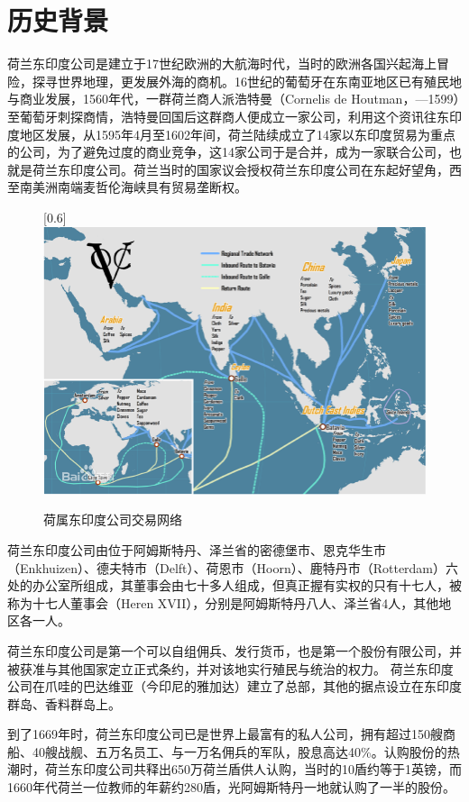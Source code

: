 \documentclass{ctexbook}
\begin{document}
\section{历史背景}
荷兰东印度公司是建立于17世纪欧洲的大航海时代，当时的欧洲各国兴起海上冒险，探寻世界地理，更发展外海的商机。16世纪的葡萄牙在东南亚地区已有殖民地与商业发展，1560年代，一群荷兰商人派浩特曼（Cornelis de Houtman，—1599）至葡萄牙刺探商情，浩特曼回国后这群商人便成立一家公司，利用这个资讯往东印度地区发展，从1595年4月至1602年间，荷兰陆续成立了14家以东印度贸易为重点的公司，为了避免过度的商业竞争，这14家公司于是合并，成为一家联合公司，也就是荷兰东印度公司。荷兰当时的国家议会授权荷兰东印度公司在东起好望角，西至南美洲南端麦哲伦海峡具有贸易垄断权。
\begin{figure}[h]
    \centering
    \caption{荷属东印度公司交易网络}
    \scalebox{1}[0.6]{
    \includegraphics[width=1\linewidth]{figure-4.jpg}}
\end{figure}

荷兰东印度公司由位于阿姆斯特丹、泽兰省的密德堡市、恩克华生市（Enkhuizen）、德夫特市（Delft）、荷恩市（Hoorn）、鹿特丹市（Rotterdam）六处的办公室所组成，其董事会由七十多人组成，但真正握有实权的只有十七人，被称为十七人董事会（Heren XVII），分别是阿姆斯特丹八人、泽兰省4人，其他地区各一人。

荷兰东印度公司是第一个可以自组佣兵、发行货币，也是第一个股份有限公司，并被获准与其他国家定立正式条约，并对该地实行殖民与统治的权力。
荷兰东印度公司在爪哇的巴达维亚（今印尼的雅加达）建立了总部，其他的据点设立在东印度群岛、香料群岛上。

到了1669年时，荷兰东印度公司已是世界上最富有的私人公司，拥有超过150艘商船、40艘战舰、五万名员工、与一万名佣兵的军队，股息高达40\%。认购股份的热潮时，荷兰东印度公司共释出650万荷兰盾供人认购，当时的10盾约等于1英镑，而1660年代荷兰一位教师的年薪约280盾，光阿姆斯特丹一地就认购了一半的股份。
  
\end{document}
